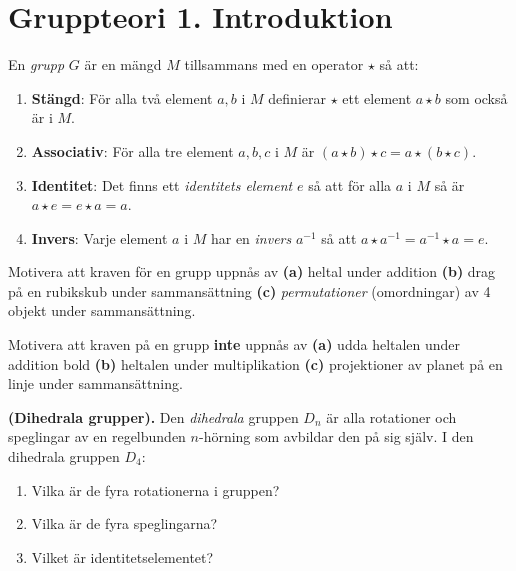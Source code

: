 \documentclass[11pt,fleqn]{book} %
\begin{document}
  \renewcommand*\rmdefault{ppl}\normalfont\upshape

\chapter{Gruppteori 1. Introduktion}
\large
\thispagestyle{empty}


\begin{definition} En \textit{grupp} \(G\) är en mängd \(M\) tillsammans med en operator \(\star \) så att:
  \begin{enumerate} %
    \item \textbf{Stängd}: För alla två element \(a, b\) i \(M\) definierar \( \star \) ett element \(a  \star b\) som också är i \(M\).
    \item \textbf{Associativ}: För alla tre element \(a, b, c\) i \(M\) är \((a  \star b)  \star c = a  \star (b  \star c)\).
    \item \textbf{Identitet}: Det finns ett \textit{identitets element} \(e\) så att för alla \(a\) i \(M\) så är \(a  \star e = e  \star a = a\).
    \item \textbf{Invers}: Varje element \(a\) i \(M\) har en \textit{invers}  \(a ^{-1}\) så att \(a  \star a^{-1} = a^{-1}  \star a = e\).
  \end{enumerate}
\end{definition}

\begin{problem} Motivera att kraven för en grupp uppnås av
  \textbf{(a)} heltal under addition \textbf{(b)} drag på en rubikskub under sammansättning \textbf{(c)} \textit{permutationer} (omordningar) av 4 objekt under sammansättning.
\end{problem}

\begin{problem} Motivera att kraven på en grupp \textbf{inte} uppnås av 
  \textbf{(a)} udda heltalen under addition bold \textbf{(b)} heltalen under multiplikation \textbf{(c)} projektioner av planet på en linje under sammansättning. %
\end{problem}

\begin{problem} \textbf{(Dihedrala grupper).} Den \textit{dihedrala} gruppen \(D_n\) är alla rotationer och speglingar av en regelbunden \(n\)-hörning som avbildar den på sig själv. I den dihedrala gruppen \(D_4\):
  \begin{enumerate}[label=\textbf{(\alph*)}]
    \item Vilka är de fyra rotationerna i gruppen?
    \item Vilka är de fyra speglingarna?
    \item Vilket är identitetselementet?
  \end{enumerate}
\end{problem}
\end{document}
